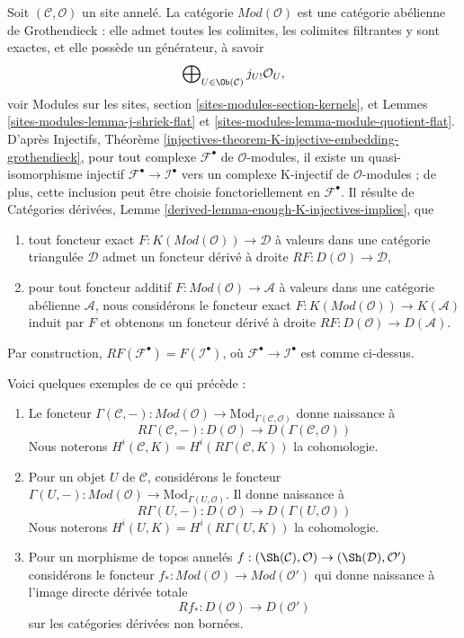 \noindent
Soit $(\mathcal{C}, \mathcal{O})$ un site annelé. La catégorie
$\textit{Mod}(\mathcal{O})$ est une catégorie abélienne de Grothendieck :
elle admet toutes les colimites, les colimites filtrantes y sont exactes,
et elle possède un générateur, à savoir
$$
\bigoplus\nolimits_{U \in \Ob(\mathcal{C})} j_{U!}\mathcal{O}_U,
$$
voir Modules sur les sites, section \ref{sites-modules-section-kernels}, et
Lemmes \ref{sites-modules-lemma-j-shriek-flat} et
\ref{sites-modules-lemma-module-quotient-flat}. D'après Injectifs, Théorème
\ref{injectives-theorem-K-injective-embedding-grothendieck}, pour tout
complexe $\mathcal{F}^\bullet$ de $\mathcal{O}$-modules, il existe un
quasi-isomorphisme injectif
$\mathcal{F}^\bullet \to \mathcal{I}^\bullet$ vers un complexe K-injectif
de $\mathcal{O}$-modules ; de plus, cette inclusion peut être choisie
fonctoriellement en $\mathcal{F}^\bullet$. Il résulte de Catégories
dérivées, Lemme \ref{derived-lemma-enough-K-injectives-implies}, que
\begin{enumerate}
\item tout foncteur exact $F : K(\textit{Mod}(\mathcal{O})) \to \mathcal{D}$
à valeurs dans une catégorie triangulée $\mathcal{D}$ admet un foncteur
dérivé à droite
$RF : D(\mathcal{O}) \to \mathcal{D}$,
\item pour tout foncteur additif
$F : \textit{Mod}(\mathcal{O}) \to \mathcal{A}$
à valeurs dans une catégorie abélienne $\mathcal{A}$, nous considérons le
foncteur exact $F : K(\textit{Mod}(\mathcal{O})) \to K(\mathcal{A})$
induit par $F$ et obtenons un foncteur dérivé à droite
$RF : D(\mathcal{O}) \to D(\mathcal{A})$.
\end{enumerate}
Par construction, $RF(\mathcal{F}^\bullet) = F(\mathcal{I}^\bullet)$, où
$\mathcal{F}^\bullet \to \mathcal{I}^\bullet$ est comme ci-dessus.

\medskip\noindent
Voici quelques exemples de ce qui précède :
\begin{enumerate}
\item Le foncteur $\Gamma(\mathcal{C}, -) : \textit{Mod}(\mathcal{O}) \to
\text{Mod}_{\Gamma(\mathcal{C}, \mathcal{O})}$ donne naissance à
$$
R\Gamma(\mathcal{C}, -) :
D(\mathcal{O})
\longrightarrow
D(\Gamma(\mathcal{C}, \mathcal{O}))
$$
Nous noterons
$H^i(\mathcal{C}, K) = H^i(R\Gamma(\mathcal{C}, K))$ la cohomologie.
\item Pour un objet $U$ de $\mathcal{C}$, considérons le foncteur
$\Gamma(U, -) : \textit{Mod}(\mathcal{O}) \to
\text{Mod}_{\Gamma(U, \mathcal{O})}$. Il donne naissance à
$$
R\Gamma(U, -) : D(\mathcal{O}) \to D(\Gamma(U, \mathcal{O}))
$$
Nous noterons $H^i(U, K) = H^i(R\Gamma(U, K))$ la cohomologie.
\item Pour un morphisme de topos annelés
$f : (\Sh(\mathcal{C}), \mathcal{O}) \to (\Sh(\mathcal{D}), \mathcal{O}')$
considérons le foncteur
$f_* : \textit{Mod}(\mathcal{O}) \to \textit{Mod}(\mathcal{O}')$
qui donne naissance à l'image directe dérivée totale
$$
Rf_* : D(\mathcal{O}) \longrightarrow D(\mathcal{O}')
$$
sur les catégories dérivées non bornées.
\end{enumerate}

